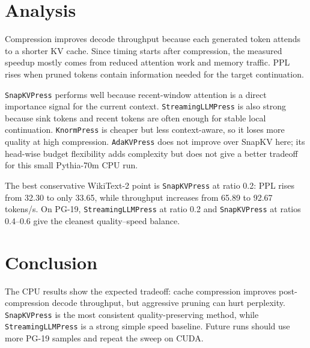 \documentclass{article}
\begin{document}
\section{Analysis}

Compression improves decode throughput because each generated token attends to a
shorter KV cache. Since timing starts after compression, the measured speedup
mostly comes from reduced attention work and memory traffic. PPL rises when
pruned tokens contain information needed for the target continuation.

\texttt{SnapKVPress} performs well because recent-window attention is a direct
importance signal for the current context. \texttt{StreamingLLMPress} is also
strong because sink tokens and recent tokens are often enough for stable local
continuation. \texttt{KnormPress} is cheaper but less context-aware, so it loses
more quality at high compression. \texttt{AdaKVPress} does not improve over
SnapKV here; its head-wise budget flexibility adds complexity but does not give
a better tradeoff for this small Pythia-70m CPU run.

The best conservative WikiText-2 point is \texttt{SnapKVPress} at ratio 0.2:
PPL rises from 32.30 to only 33.65, while throughput increases from 65.89 to
92.67 tokens/s. On PG-19, \texttt{StreamingLLMPress} at ratio 0.2 and
\texttt{SnapKVPress} at ratios 0.4--0.6 give the cleanest quality--speed balance.

\section{Conclusion}

The CPU results show the expected tradeoff: cache compression improves
post-compression decode throughput, but aggressive pruning can hurt perplexity.
\texttt{SnapKVPress} is the most consistent quality-preserving method, while
\texttt{StreamingLLMPress} is a strong simple speed baseline. Future runs should
use more PG-19 samples and repeat the sweep on CUDA.
\end{document}
